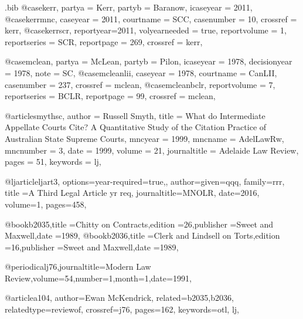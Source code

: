 \begin{filecontents*}{\jobname.bib}
@case{kerr,
  partya = {Kerr}, 
  partyb = {Baranow},
  icaseyear = {2011},
  }
@case{kerrmnc,
  caseyear = {2011},
  courtname = {SCC},
  casenumber = {10},
  crossref = {kerr},
  }
@case{kerrscr,
  reportyear={2011},
  volyearneeded = {true},
  reportvolume = {1},
  reportseries = {SCR},
  reportpage = {269},
  crossref = {kerr},
  	}





@case{mclean,
  partya = {McLean}, 
  partyb = {Pilon},
  icaseyear = {1978},
  decisionyear = {1978},
  note = {SC},
  }
@case{mcleanlii,
  caseyear = {1978},
  courtname = {CanLII},
  casenumber = {237},
  crossref = {mclean},
  }
@case{mcleanbclr,
  reportvolume = {7},
  reportseries = {BCLR},
  reportpage = {99},
  crossref = {mclean},
  	}









@article{smythsc,
author = {Russell Smyth},
title = {What do Intermediate Appellate Courts Cite? A Quantitative Study of the Citation Practice of Australian State Supreme Courts},
mncyear = {1999},
mncname = {AdelLawRw},
mncnumber = {3},
date = {1999},
volume = {21},
journaltitle = {Adelaide Law Review},
pages = {51},
keywords = {lj},
}





@ljarticle{ljart3,
options={year-required=true,},
author={given=qqq, family=rrr},
title ={A Third Legal Article yr req},
journaltitle={MNOLR},
date={2016},
volume={1},
pages={458},
}

@book{b2035,title ={Chitty on Contracts},edition ={26},publisher ={Sweet and Maxwell},date ={1989},}
@book{b2036,title ={Clerk and Lindsell on Torts},edition ={16},publisher ={Sweet and Maxwell},date ={1989},}

@periodical{j76,journaltitle={Modern Law Review},volume={54},number={1},month={1},date={1991},}

@article{a104,
author={Ewan McKendrick},
related={b2035,b2036},
relatedtype={reviewof},
crossref={j76},
pages={162},
keywords={otl, lj},
}



\end{filecontents*}
